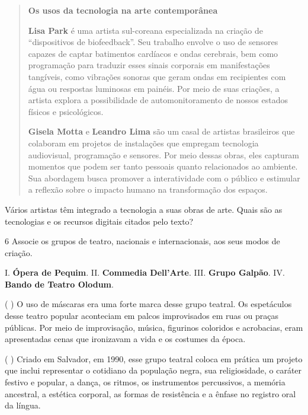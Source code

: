 \begin{quote}
\textbf{Os usos da tecnologia na arte contemporânea}

\textbf{Lisa Park} é uma artista sul-coreana especializada na criação de
``dispositivos de biofeedback''. Seu trabalho envolve o uso de 
sensores capazes de captar batimentos cardíacos e ondas cerebrais, 
bem como programação para traduzir esses sinais corporais em 
manifestações tangíveis, como vibrações sonoras que geram ondas 
em recipientes com água ou respostas luminosas em painéis. Por meio 
de suas criações, a artista explora a possibilidade de automonitoramento 
de nossos estados físicos e psicológicos.

\textbf{Gisela Motta} e \textbf{Leandro Lima} são um casal de artistas brasileiros que 
colaboram em projetos de instalações que empregam tecnologia audiovisual, 
programação e sensores. Por meio dessas obras, eles capturam momentos 
que podem ser tanto pessoais quanto relacionados ao ambiente. Sua abordagem 
busca promover a interatividade com o público e estimular a reflexão sobre 
o impacto humano na transformação dos espaços.

\end{quote}

Vários artistas têm integrado a tecnologia a suas obras de arte. Quais
são as tecnologias e os recursos digitais citados pelo texto?


\num{6} Associe os grupos de teatro, nacionais e internacionais, aos seus modos de criação.

I. \textbf{Ópera de Pequim}.
II. \textbf{Commedia Dell'Arte}.
III. \textbf{Grupo Galpão}.
IV. \textbf{Bando de Teatro Olodum}.

(  ) O uso de máscaras era uma forte marca desse grupo teatral. Os
espetáculos desse teatro popular aconteciam em palcos improvisados em
ruas ou praças públicas. Por meio de improvisação, música, figurinos
coloridos e acrobacias, eram apresentadas cenas que ironizavam a vida e
os costumes da época.

(  ) Criado em Salvador, em 1990, esse grupo teatral coloca em prática um
projeto que inclui representar o cotidiano da população negra, sua
religiosidade, o caráter festivo e popular, a dança, os ritmos, os
instrumentos percussivos, a memória ancestral, a estética corporal, as
formas de resistência e a ênfase no registro oral da língua.

